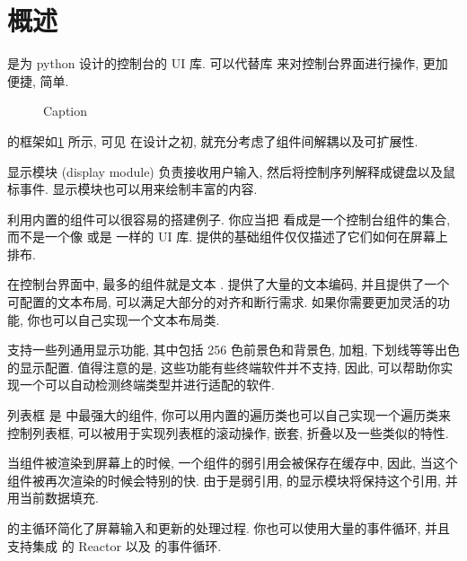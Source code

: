 \section{\urwid{} 概述}
\indent\urwid{} 是为 python 设计的控制台的 UI 库. \urwid{} 可以代替库  来对控制台界面进行操作, 更加便捷, 简单.%
%
\begin{figure}[!htb]
    \centering
    
    \caption{Caption}
    \label{fig:structure_of_urwid_library}
\end{figure}%
%
\urwid{} 的框架如\cref{fig:structure_of_urwid_library} 所示, 可见 \urwid{} 在设计之初, 就充分考虑了组件间解耦以及可扩展性.

显示模块 (display module) 负责接收用户输入, 然后将控制序列解释成键盘以及鼠标事件. 显示模块也可以用来绘制丰富的内容.

利用内置的组件可以很容易的搭建例子. 你应当把 \urwid{} 看成是一个控制台组件的集合, 而不是一个像  或是  一样的 UI 库. \urwid{} 提供的基础组件仅仅描述了它们如何在屏幕上排布.

在控制台界面中, 最多的组件就是文本 . \urwid{} 提供了大量的文本编码, 并且提供了一个可配置的文本布局, 可以满足大部分的对齐和断行需求. 如果你需要更加灵活的功能, 你也可以自己实现一个文本布局类.

\urwid{} 支持一些列通用显示功能, 其中包括 256 色前景色和背景色, 加粗, 下划线等等出色的显示配置. 值得注意的是, 这些功能有些终端软件并不支持, 因此, \urwid{} 可以帮助你实现一个可以自动检测终端类型并进行适配的软件.

列表框  是 \urwid{} 中最强大的组件, 你可以用内置的遍历类也可以自己实现一个遍历类来控制列表框, 可以被用于实现列表框的滚动操作, 嵌套, 折叠以及一些类似的特性.

当组件被渲染到屏幕上的时候, 一个组件的弱引用会被保存在缓存中, 因此, 当这个组件被再次渲染的时候会特别的快. 由于是弱引用, \urwid{} 的显示模块将保持这个引用, 并用当前数据填充.

\urwid{} 的主循环简化了屏幕输入和更新的处理过程. 你也可以使用大量的事件循环, 并且支持集成  的 Reactor 以及  的事件循环.